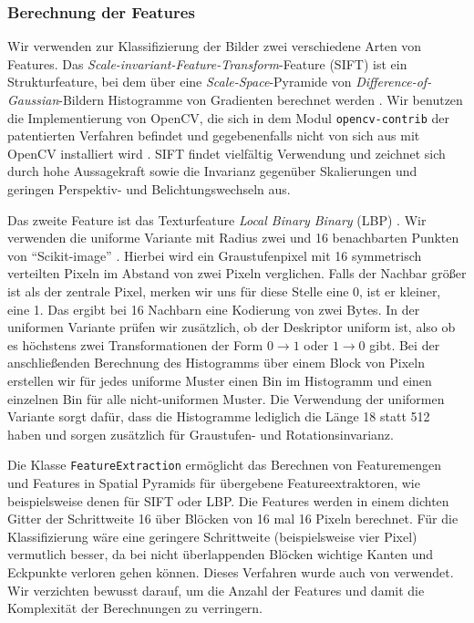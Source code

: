 \subsubsection{Berechnung der Features}

Wir verwenden zur Klassifizierung der Bilder zwei verschiedene Arten von Features. Das \emph{Scale-invariant-Feature-Transform}-Feature (SIFT) ist ein Strukturfeature, bei dem über eine \emph{Scale-Space}-Pyramide von \emph{Difference-of-Gaussian}-Bildern Histogramme von Gradienten berechnet werden \cite{lowe99}. Wir benutzen die Implementierung von OpenCV, die sich in dem Modul \texttt{opencv-contrib} der patentierten Verfahren befindet und gegebenenfalls nicht von sich aus mit OpenCV installiert wird \cite{ocv}. SIFT findet vielfältig Verwendung und zeichnet sich durch hohe Aussagekraft sowie die Invarianz gegenüber Skalierungen und geringen Perspektiv- und Belichtungswechseln aus.

Das zweite Feature ist das Texturfeature \emph{Local Binary Binary} (LBP) \cite{oph94}. Wir verwenden die uniforme Variante mit Radius zwei und 16 benachbarten Punkten von \enquote{Scikit-image} \cite{skimg}. Hierbei wird ein Graustufenpixel mit 16 symmetrisch verteilten Pixeln im Abstand von zwei Pixeln verglichen. Falls der Nachbar größer ist als der zentrale Pixel, merken wir uns für diese Stelle eine 0, ist er kleiner, eine 1. Das ergibt bei 16 Nachbarn eine Kodierung von zwei Bytes. In der uniformen Variante prüfen wir zusätzlich, ob der Deskriptor uniform ist, also ob es höchstens zwei Transformationen der Form $0 \rightarrow 1$ oder $1 \rightarrow 0$ gibt. Bei der anschließenden Berechnung des Histogramms über einem Block von Pixeln erstellen wir für jedes uniforme Muster einen Bin im Histogramm und einen einzelnen Bin für alle nicht-uniformen Muster. Die Verwendung der uniformen Variante sorgt dafür, dass die Histogramme lediglich die Länge 18 statt 512 haben und sorgen zusätzlich für Graustufen- und Rotationsinvarianz. 

Die Klasse \texttt{FeatureExtraction} ermöglicht das Berechnen von Featuremengen und Features in Spatial Pyramids für übergebene Featureextraktoren, wie beispielsweise denen für SIFT oder LBP. Die Features werden in einem dichten Gitter der Schrittweite 16 über Blöcken von 16 mal 16 Pixeln berechnet. Für die Klassifizierung wäre eine geringere Schrittweite (beispielsweise vier Pixel) vermutlich besser, da bei nicht überlappenden Blöcken wichtige Kanten und Eckpunkte verloren gehen können. Dieses Verfahren wurde auch von \cite{ywkjwh13} verwendet. Wir verzichten bewusst darauf, um die Anzahl der Features und damit die Komplexität der Berechnungen zu verringern.

